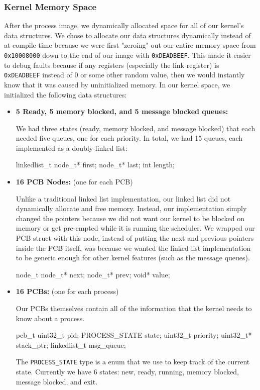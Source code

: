 \documentclass[se]{uw-wkrpt}
\begin{document}
\subsubsection{Kernel Memory Space}

After the process image, we dynamically allocated space for all of our kernel's data structures. We chose to allocate our data structures dynamically instead of at compile time because we were first "zeroing" out our entire memory space from \texttt{0x10008000} down to the end of our image with \texttt{0xDEADBEEF}. This made it easier to debug faults because if any registers (especially the link register) is \texttt{0xDEADBEEF} instead of 0 or some other random value, then we would instantly know that it was caused by uninitialized memory. In our kernel space, we initialized the following data structures:

\begin{itemize}
	\item \textbf{5 Ready, 5 memory blocked, and 5 message blocked queues:} 
	
	We had three states (ready, memory blocked, and message blocked) that each needed five queues, one for each priority. In total, we had 15 queues, each implemented as a doubly-linked list:
	\begin{code}
linkedlist_t
    node_t* first;
    node_t* last;
    int length;
	\end{code}
	
	\item \textbf{16 PCB Nodes:} (one for each PCB)
	
	Unlike a traditional linked list implementation, our linked list did not dynamically allocate and free memory. Instead, our implementation simply changed the pointers because we did not want our kernel to be blocked on memory or get pre-empted while it is running the scheduler. We wrapped our PCB struct with this node, instead of putting the next and previous pointers inside the PCB itself, was because we wanted the linked list implementation to be generic enough for other kernel features (such as the message queues).
	\begin{code}
node_t
    node_t* next;
    node_t* prev;
    void* value;
	\end{code}
	
	\item \textbf{16 PCBs:} (one for each process)
	
	Our PCBs themselves contain all of the information that the kernel needs to know about a process.
	\begin{code}
pcb_t
    uint32_t pid;
    PROCESS_STATE state;
    uint32_t priority;
    uint32_t* stack_ptr;
    linkedlist_t msg_queue;
	\end{code}
	
	The \texttt{PROCESS\_STATE} type is a enum that we use to keep track of the current state. Currently we have 6 states: new, ready, running, memory blocked, message blocked, and exit. 
	
\end{itemize}
\end{document}
